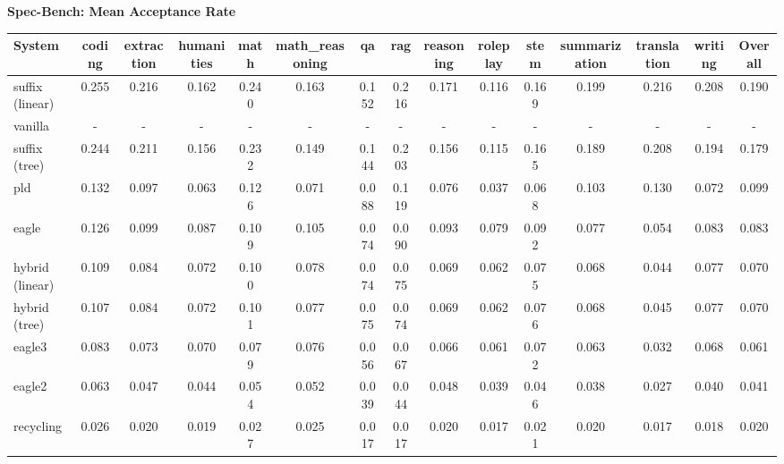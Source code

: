 \textbf{Spec-Bench: Mean Acceptance Rate}
\begin{table}[H]
\begin{adjustbox}{width=\linewidth}
\centering
\begin{tabular}{lcccccccccccccc}
\toprule
\textbf{System} & coding & extraction & humanities & math & math\_reasoning & qa & rag & reasoning & roleplay & stem & summarization & translation & writing & \textbf{Overall} \\
\midrule
suffix (linear) & 0.255 & 0.216 & 0.162 & 0.240 & 0.163 & 0.152 & 0.216 & 0.171 & 0.116 & 0.169 & 0.199 & 0.216 & 0.208 & 0.190 \\
vanilla & - & - & - & - & - & - & - & - & - & - & - & - & - & - \\
suffix (tree) & 0.244 & 0.211 & 0.156 & 0.232 & 0.149 & 0.144 & 0.203 & 0.156 & 0.115 & 0.165 & 0.189 & 0.208 & 0.194 & 0.179 \\
pld & 0.132 & 0.097 & 0.063 & 0.126 & 0.071 & 0.088 & 0.119 & 0.076 & 0.037 & 0.068 & 0.103 & 0.130 & 0.072 & 0.099 \\
eagle & 0.126 & 0.099 & 0.087 & 0.109 & 0.105 & 0.074 & 0.090 & 0.093 & 0.079 & 0.092 & 0.077 & 0.054 & 0.083 & 0.083 \\
hybrid (linear) & 0.109 & 0.084 & 0.072 & 0.100 & 0.078 & 0.074 & 0.075 & 0.069 & 0.062 & 0.075 & 0.068 & 0.044 & 0.077 & 0.070 \\
hybrid (tree) & 0.107 & 0.084 & 0.072 & 0.101 & 0.077 & 0.075 & 0.074 & 0.069 & 0.062 & 0.076 & 0.068 & 0.045 & 0.077 & 0.070 \\
eagle3 & 0.083 & 0.073 & 0.070 & 0.079 & 0.076 & 0.056 & 0.067 & 0.066 & 0.061 & 0.072 & 0.063 & 0.032 & 0.068 & 0.061 \\
eagle2 & 0.063 & 0.047 & 0.044 & 0.054 & 0.052 & 0.039 & 0.044 & 0.048 & 0.039 & 0.046 & 0.038 & 0.027 & 0.040 & 0.041 \\
recycling & 0.026 & 0.020 & 0.019 & 0.027 & 0.025 & 0.017 & 0.017 & 0.020 & 0.017 & 0.021 & 0.020 & 0.017 & 0.018 & 0.020 \\
\bottomrule
\end{tabular}
\end{adjustbox}
\end{table}

